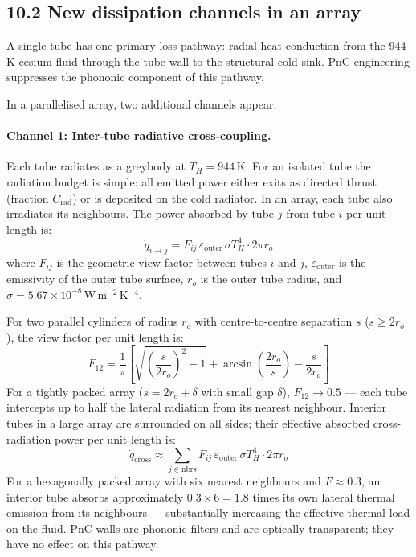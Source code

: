 \documentclass[12pt]{article}
\begin{document}
\subsection*{10.2 New dissipation channels in an array}

A single tube has one primary loss pathway: radial heat conduction from the
944\,K cesium fluid through the tube wall to the structural cold sink.
PnC engineering suppresses the phononic component of this pathway.

In a parallelised array, two additional channels appear.

\paragraph{Channel 1: Inter-tube radiative cross-coupling.}
Each tube radiates as a greybody at $T_H = 944$\,K. For an isolated tube the
radiation budget is simple: all emitted power either exits as directed thrust
(fraction $C_{\mathrm{rad}}$) or is deposited on the cold radiator. In an
array, each tube also irradiates its neighbours. The power absorbed by tube
$j$ from tube $i$ per unit length is:
\begin{equation}
  \dot{q}_{i \to j} = F_{ij}\,\varepsilon_{\mathrm{outer}}\,\sigma T_H^4 \cdot 2\pi r_o
  \label{eq:cross}
\end{equation}
where $F_{ij}$ is the geometric view factor between tubes $i$ and $j$,
$\varepsilon_{\mathrm{outer}}$ is the emissivity of the outer tube surface,
$r_o$ is the outer tube radius, and $\sigma = 5.67\times10^{-8}$\,W\,m$^{-2}$\,K$^{-4}$.

For two parallel cylinders of radius $r_o$ with centre-to-centre separation
$s$ ($s \geq 2r_o$), the view factor per unit length is:
\begin{equation}
  F_{12} = \frac{1}{\pi}\left[
    \sqrt{\left(\frac{s}{2r_o}\right)^2 - 1}
    + \arcsin\!\left(\frac{2r_o}{s}\right)
    - \frac{s}{2r_o}
  \right]
  \label{eq:viewfactor}
\end{equation}
For a tightly packed array ($s = 2r_o + \delta$ with small gap $\delta$),
$F_{12} \to 0.5$ — each tube intercepts up to half the lateral radiation from
its nearest neighbour. Interior tubes in a large array are surrounded on all
sides; their effective absorbed cross-radiation power per unit length is:
\begin{equation}
  \dot{q}_{\mathrm{cross}} \approx \sum_{j \in \mathrm{nbrs}} F_{ij}\,
  \varepsilon_{\mathrm{outer}}\,\sigma T_H^4 \cdot 2\pi r_o
\end{equation}
For a hexagonally packed array with six nearest neighbours and $F \approx 0.3$,
an interior tube absorbs approximately $0.3 \times 6 = 1.8$ times its own
lateral thermal emission from its neighbours — substantially increasing the
effective thermal load on the fluid. PnC walls are phononic filters and are
optically transparent; they have no effect on this pathway.
\end{document}
